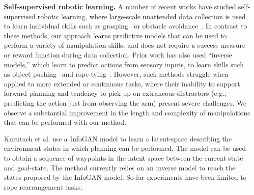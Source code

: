 \noindent \textbf{Self-supervised robotic learning.}
A number of recent works have studied self-supervised robotic learning, where large-scale unattended data collection is used to learn individual skills such as grasping~\cite{lerrel,google_handeye} or obstacle avoidance~\cite{greg_kahn_uncertainty,crashing}.
In contrast to these methods, our approach learns predictive models that can be used to perform a variety of manipulation skills, and does not require a success measure or reward function during data collection. Prior work has also used ``inverse models,'' which learn to predict actions from sensory inputs, to learn skills such as object pushing~\cite{pulkit} and rope tying~\cite{nair_icra_2017}.
However, such methods struggle when applied to more extended or continuous tasks, where their inability to support forward planning and tendency to pick up on extraneous distractors (e.g., predicting the action just from observing the arm) present severe challenges. We observe a substantial improvement in the length and complexity of manipulations that can be performed with our method.

Kurutach et al. use a InfoGAN model \cite{kurutach2018learning} to learn a latent-space describing the environment states in which planning can be performed. The model can be used to obtain a sequence of waypoints in the latent space between the current state and goal-state. The method currently relies on an inverse model to reach the states proposed by the InfoGAN model. So far experiments have been limited to rope rearrangement tasks.

